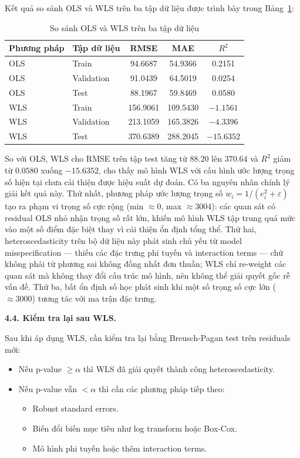 Kết quả so sánh OLS và WLS trên ba tập dữ liệu được trình bày trong Bảng~\ref{tab:wls_comparison}:

\begin{table}[H]
\centering
\caption{So sánh OLS và WLS trên ba tập dữ liệu}
\label{tab:wls_comparison}
\begin{tabular}{llccc}
\hline
Phương pháp & Tập dữ liệu & RMSE & MAE & $R^2$ \\
\hline
OLS & Train      & \phantom{0}94.6687  & \phantom{0}54.9366  & \phantom{$-$}0.2151  \\
OLS & Validation & \phantom{0}91.0439  & \phantom{0}64.5019  & \phantom{$-$}0.0254  \\
OLS & Test       & \phantom{0}88.1967  & \phantom{0}59.8469  & \phantom{$-$}0.0580  \\
\hline
WLS & Train      & 156.9061 & 109.5430 & $-1.1561$  \\
WLS & Validation & 213.1059 & 165.3826 & $-4.3396$  \\
WLS & Test       & 370.6389 & 288.2045 & $-15.6352$ \\
\hline
\end{tabular}
\end{table}

So với OLS, WLS cho RMSE trên tập test tăng từ $88.20$ lên $370.64$ và $R^2$ giảm từ $0.0580$ xuống $-15.6352$, cho thấy mô hình WLS với cấu hình ước lượng trọng số hiện tại chưa cải thiện được hiệu suất dự đoán. Có ba nguyên nhân chính lý giải kết quả này. Thứ nhất, phương pháp ước lượng trọng số $w_i = 1/(e_i^2 + \varepsilon)$ tạo ra phạm vi trọng số cực rộng (min $\approx 0$, max $\approx 3004$): các quan sát có residual OLS nhỏ nhận trọng số rất lớn, khiến mô hình WLS tập trung quá mức vào một số điểm đặc biệt thay vì cải thiện ổn định tổng thể. Thứ hai, heteroscedasticity trên bộ dữ liệu này phát sinh chủ yếu từ model misspecification --- thiếu các đặc trưng phi tuyến và interaction terms --- chứ không phải từ phương sai không đồng nhất đơn thuần; WLS chỉ re-weight các quan sát mà không thay đổi cấu trúc mô hình, nên không thể giải quyết gốc rễ vấn đề. Thứ ba, bất ổn định số học phát sinh khi một số trọng số cực lớn ($\approx 3000$) tương tác với ma trận đặc trưng.

\textbf{4.4. Kiểm tra lại sau WLS.}

Sau khi áp dụng WLS, cần kiểm tra lại bằng Breusch-Pagan test trên residuals mới:
\begin{itemize}[labelsep=10pt, leftmargin=2cm]
    \item Nếu p-value $\geq \alpha$ thì WLS đã giải quyết thành công heteroscedasticity.
    \item Nếu p-value vẫn $< \alpha$ thì cần các phương pháp tiếp theo:
    \begin{itemize}
        \item Robust standard errors.
        \item Biến đổi biến mục tiêu như log transform hoặc Box-Cox.
        \item Mô hình phi tuyến hoặc thêm interaction terms.
    \end{itemize}
\end{itemize}

